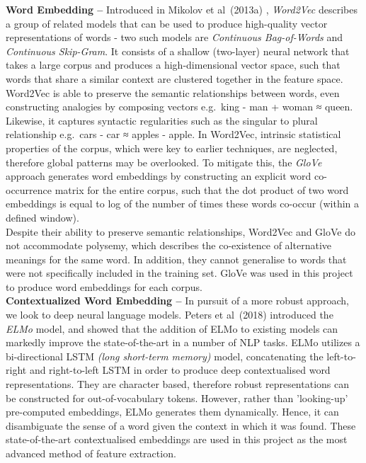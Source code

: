 \documentclass[12pt,a4paper]{article}
\begin{document}
\noindent \textbf{Word Embedding --} Introduced in Mikolov et al\ (2013a) \cite{mikolov2013efficient}, \textit{Word2Vec} describes a group of related models that can be used to produce high-quality vector representations of words - two such models are \textit{Continuous Bag-of-Words} and \textit{Continuous Skip-Gram}. It consists of a shallow (two-layer) neural network that takes a large corpus and produces a high-dimensional vector space, such that words that share a similar context are clustered together in the feature space. Word2Vec is able to preserve the semantic relationships between words, even constructing analogies by composing vectors e.g.\ king - man + woman ≈ queen. Likewise, it captures syntactic regularities such as the singular to plural relationship e.g.\ cars - car ≈ apples - apple. In Word2Vec, intrinsic statistical properties of the corpus, which were key to earlier techniques, are neglected, therefore global patterns may be overlooked. To mitigate this, the \textit{GloVe} \cite{pennington2014glove} approach generates word embeddings by constructing an explicit word co-occurrence matrix for the entire corpus, such that the dot product of two word embeddings is equal to log of the number of times these words co-occur (within a defined window). \\
Despite their ability to preserve semantic relationships, Word2Vec and GloVe do not accommodate polysemy, which describes the co-existence of alternative meanings for the same word. In addition, they cannot generalise to words that were not specifically included in the training set. GloVe was used in this project to produce word embeddings for each corpus.\\


\noindent \textbf{Contextualized Word Embedding --}
In pursuit of a more robust approach, we look to deep neural language models. Peters et al\ (2018) \cite{peters2018deep} introduced the \textit{ELMo} model, and showed that the addition of ELMo to existing models can markedly improve the state-of-the-art in a number of NLP tasks. ELMo utilizes a bi-directional LSTM \textit{(long short-term memory)} model, concatenating the left-to-right and right-to-left LSTM in order to produce deep contextualised word representations. They are character based, therefore robust representations can be constructed for out-of-vocabulary tokens. However, rather than 'looking-up' pre-computed embeddings, ELMo generates them dynamically. Hence, it can disambiguate the sense of a word given the context in which it was found. These state-of-the-art contextualised embeddings are used in this project as the most advanced method of feature extraction.\\
\end{document}
